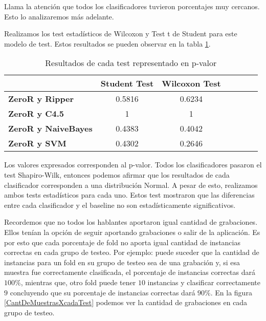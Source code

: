 Llama la atención que todos los clasificadores tuvieron porcentajes muy cercanos. Esto lo analizaremos más adelante. 

Realizamos los test estadísticos de Wilcoxon y Test t de Student para este modelo de test. Estos resultados se pueden observar en la tabla  \ref{HPTDT_res_tests_wilcoxon_student}.

\begin{table}[H]
	\centering
	\begin{tabular}{|l|c|c|c|c|c|c|}
		\hline
		\textbf{}  & \textbf{Student Test} & \textbf{Wilcoxon Test} \\ \hline
		\textbf{ZeroR y Ripper}  & 0.5816 & 0.6234 \\ \hline
		\textbf{ZeroR y C4.5}  & 1 & 1 \\ \hline
		\textbf{ZeroR y NaiveBayes}  & 0.4383 & 0.4042 \\ \hline
		\textbf{ZeroR y SVM}  & 0.4302 & 0.2646 \\ \hline
	\end{tabular}
	\caption{Resultados de cada test representado en p-valor}
	\label{HPTDT_res_tests_wilcoxon_student}
\end{table}

Los valores expresados corresponden al p-valor. Todos los clasificadores pasaron el test Shapiro-Wilk, entonces podemos afirmar que los resultados de cada clasificador corresponden a una distribución Normal. A pesar de esto, realizamos ambos tests estadísticos para cada uno. Estos test mostraron que las diferencias entre cada clasificador y el baseline no son estadísticamente significativos.

Recordemos que no todos los hablantes aportaron igual cantidad de grabaciones. Ellos tenían la opción de seguir aportando grabaciones o salir de la aplicación. Es por esto que cada porcentaje de fold no aporta igual cantidad de instancias correctas en cada grupo de testeo. Por ejemplo: puede suceder que la cantidad de instancias para un fold en su grupo de testeo sea de una grabación y, si esa muestra fue correctamente clasificada, el porcentaje de instancias correctas dará $100\%$, mientras que, otro fold puede tener $10$ instancias y clasificar correctamente $9$ concluyendo que su porcentaje de instancias correctas dará $90\%$. En la figura \ref{CantDeMuestrasXcadaTest} podemos ver la cantidad de grabaciones en cada grupo de testeo. 

